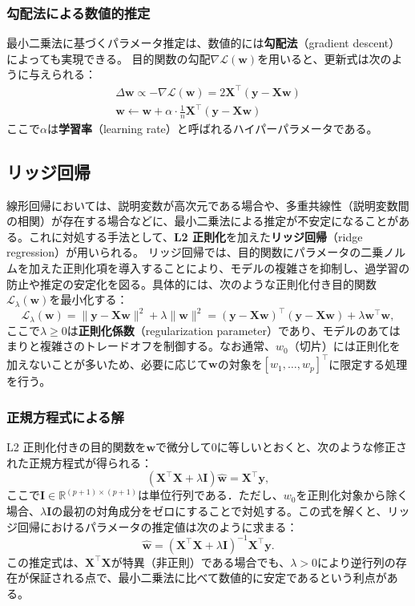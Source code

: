\subsubsection{勾配法による数値的推定}
最小二乗法に基づくパラメータ推定は、数値的には\textbf{勾配法}（gradient descent）によっても実現できる。 目的関数の勾配$\nabla \mathcal{L}(\mathbf{w})$を用いると、更新式は次のように与えられる：
\begin{align}
\Delta \mathbf{w} \propto - \nabla \mathcal{L}(\mathbf{w})= 2\mathbf{X}^\top (\mathbf{y} - \mathbf{Xw})\\
\mathbf{w} \leftarrow \mathbf{w} + \alpha \cdot \frac{1}{n} \mathbf{X}^\top (\mathbf{y} - \mathbf{Xw})
\end{align}
ここで$\alpha$は\textbf{学習率}（learning rate）と呼ばれるハイパーパラメータである。
\subsection{リッジ回帰}
線形回帰においては、説明変数が高次元である場合や、多重共線性（説明変数間の相関）が存在する場合などに、最小二乗法による推定が不安定になることがある。これに対処する手法として、\textbf{L2 正則化}を加えた\textbf{リッジ回帰}（ridge regression）が用いられる。
リッジ回帰では、目的関数にパラメータの二乗ノルムを加えた正則化項を導入することにより、モデルの複雑さを抑制し、過学習の防止や推定の安定化を図る。具体的には、次のような正則化付き目的関数$\mathcal{L}_\lambda(\mathbf{w})$を最小化する：
\begin{equation}
\mathcal{L}_\lambda(\mathbf{w}) = \|\mathbf{y} - \mathbf{Xw}\|^2 + \lambda \|\mathbf{w}\|^2 = (\mathbf{y} - \mathbf{Xw})^\top (\mathbf{y} - \mathbf{Xw}) + \lambda \mathbf{w}^\top \mathbf{w},
\end{equation}
ここで$\lambda \geq 0$は\textbf{正則化係数}（regularization parameter）であり、モデルのあてはまりと複雑さのトレードオフを制御する。なお通常、$w_0$（切片）には正則化を加えないことが多いため、必要に応じて$\mathbf{w}$の対象を$[w_1, \dots, w_p]^\top$に限定する処理を行う。
\subsubsection{正規方程式による解}
L2 正則化付きの目的関数を$\mathbf{w}$で微分して0に等しいとおくと、次のような修正された正規方程式が得られる：
\begin{equation}
(\mathbf{X}^\top \mathbf{X} + \lambda \mathbf{I}) \hat{\mathbf{w}} = \mathbf{X}^\top \mathbf{y},
\end{equation}
ここで$\mathbf{I} \in \mathbb{R}^{(p+1)\times(p+1)}$は単位行列である．ただし、$w_0$を正則化対象から除く場合、$\lambda \mathbf{I}$の最初の対角成分をゼロにすることで対処する。この式を解くと、リッジ回帰におけるパラメータの推定値は次のように求まる：
\begin{equation}
\hat{\mathbf{w}} = (\mathbf{X}^\top \mathbf{X} + \lambda \mathbf{I})^{-1} \mathbf{X}^\top \mathbf{y}.
\end{equation}
この推定式は、$\mathbf{X}^\top \mathbf{X}$が特異（非正則）である場合でも、$\lambda > 0$により逆行列の存在が保証される点で、最小二乗法に比べて数値的に安定であるという利点がある。

